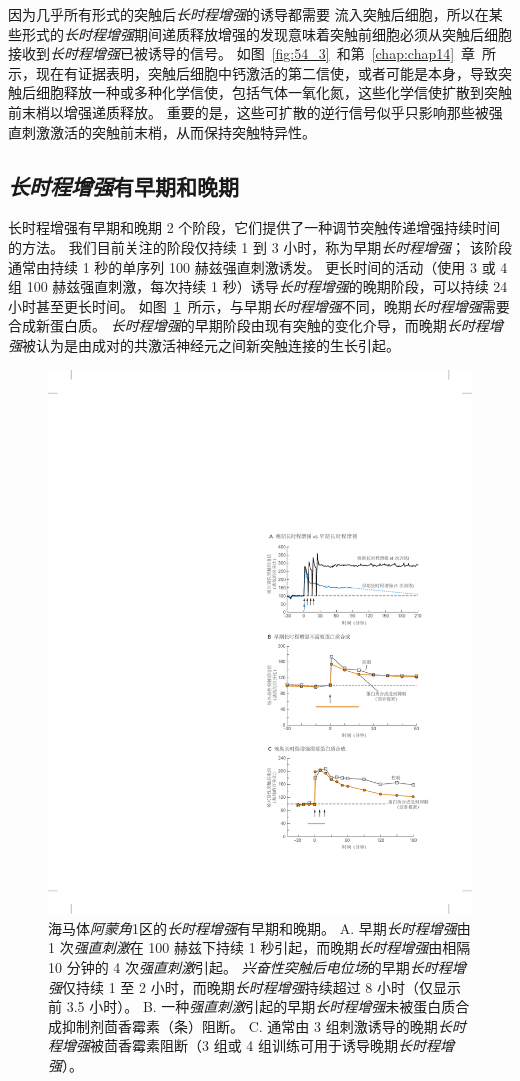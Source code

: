 因为几乎所有形式的突触后\textit{长时程增强}的诱导都需要  流入突触后细胞，所以在某些形式的\textit{长时程增强}期间递质释放增强的发现意味着突触前细胞必须从突触后细胞接收到\textit{长时程增强}已被诱导的信号。
如图~\ref{fig:54_3}~和第~\ref{chap:chap14}~章~所示，现在有证据表明，突触后细胞中钙激活的第二信使，或者可能是本身，导致突触后细胞释放一种或多种化学信使，包括气体一氧化氮，这些化学信使扩散到突触前末梢以增强递质释放。
重要的是，这些可扩散的逆行信号似乎只影响那些被强直刺激激活的突触前末梢，从而保持突触特异性。



\subsection{\textit{长时程增强}有早期和晚期}

长时程增强有早期和晚期 2 个阶段，它们提供了一种调节突触传递增强持续时间的方法。
我们目前关注的阶段仅持续 1 到 3 小时，称为早期\textit{长时程增强}；
该阶段通常由持续 1 秒的单序列 100 赫兹强直刺激诱发。
更长时间的活动（使用 3 或 4 组 100 赫兹强直刺激，每次持续 1 秒）诱导\textit{长时程增强}的晚期阶段，可以持续 24 小时甚至更长时间。
如图~\ref{fig:54_5}~所示，与早期\textit{长时程增强}不同，晚期\textit{长时程增强}需要合成新蛋白质。
\textit{长时程增强}的早期阶段由现有突触的变化介导，而晚期\textit{长时程增强}被认为是由成对的共激活神经元之间新突触连接的生长引起。


\begin{figure}[htbp]
	\centering
	\includegraphics[width=0.65\linewidth]{chap54/fig_54_5}
	\caption{海马体\textit{阿蒙角}1区的\textit{长时程增强}有早期和晚期。
		A. 早期\textit{长时程增强}由 1 次\textit{强直刺激}在 100 赫兹下持续 1 秒引起，而晚期\textit{长时程增强}由相隔 10 分钟的 4 次\textit{强直刺激}引起。
		\textit{兴奋性突触后电位场}的早期\textit{长时程增强}仅持续 1 至 2 小时，而晚期\textit{长时程增强}持续超过 8 小时（仅显示前 3.5 小时）。
		B. 一种\textit{强直刺激}引起的早期\textit{长时程增强}未被蛋白质合成抑制剂茴香霉素（条）阻断。
		C. 通常由 3 组刺激诱导的晚期\textit{长时程增强}被茴香霉素阻断（3 组或 4 组训练可用于诱导晚期\textit{长时程增强}）\cite{huang1994recruitment}。}
	\label{fig:54_5}
\end{figure}


